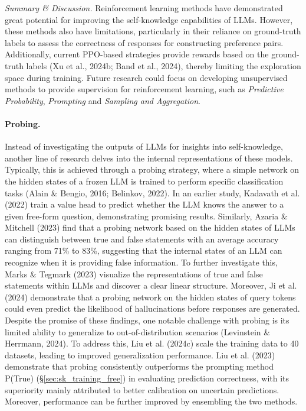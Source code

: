 \emph{Summary \& Discussion.} Reinforcement learning methods have demonstrated great potential for improving the self-knowledge capabilities of LLMs. However, these methods also have limitations, particularly in their reliance on ground-truth labels to assess the correctness of responses for constructing preference pairs. Additionally, current PPO-based strategies provide rewards based on the ground-truth labels (Xu et al., 2024b; Band et al., 2024), thereby limiting the exploration space during training. Future research could focus on developing unsupervised methods to provide supervision for reinforcement learning, such as \emph{Predictive Probability}, \emph{Prompting} and \emph{Sampling and Aggregation}.

\paragraph{Probing.} Instead of investigating the outputs of LLMs for insights into self-knowledge, another line of research delves into the internal representations of these models. Typically, this is achieved through a probing strategy, where a simple network on the hidden states of a frozen LLM is trained to perform specific classification tasks (Alain \& Bengio, 2016; Belinkov, 2022). In an earlier study, Kadavath et al. (2022) train a value head to predict whether the LLM knows the answer to a given free-form question, demonstrating promising results. Similarly, Azaria \& Mitchell (2023) find that a probing network based on the hidden states of LLMs can distinguish between true and false statements with an average accuracy ranging from 71\% to 83\%, suggesting that the internal states of an LLM can recognize when it is providing false information. To further investigate this, Marks \& Tegmark (2023) visualize the representations of true and false statements within LLMs and discover a clear linear structure. Moreover, Ji et al. (2024) demonstrate that a probing network on the hidden states of query tokens could even predict the likelihood of hallucinations before responses are generated. Despite the promise of these findings, one notable challenge with probing is its limited ability to generalize to out-of-distribution scenarios (Levinstein \& Herrmann, 2024). To address this, Liu et al. (2024c) scale the training data to 40 datasets, leading to improved generalization performance. Liu et al. (2023) demonstrate that probing consistently outperforms the prompting method P(True) (\S\ref{sec:sk_training_free}) in evaluating prediction correctness, with its superiority mainly attributed to better calibration on uncertain predictions. Moreover, performance can be further improved by ensembling the two methods.

